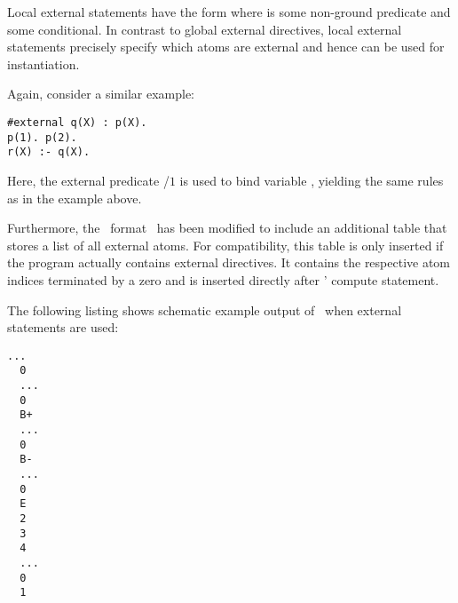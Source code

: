 Local external statements have the form  where
 is some non-ground predicate and  some conditional.
In contrast to global external directives, local external statements precisely specify 
which atoms are external and hence can be used for instantiation.
\begin{example}
Again, consider a similar example:
\begin{lstlisting}[numbers=none]
#external q(X) : p(X).
p(1). p(2).
r(X) :- q(X).
\end{lstlisting}
Here, the external predicate /$1$ is used to bind variable , 
yielding the same rules as in the example above.
\eexample
\end{example}

Furthermore, the \smodels\ format~\cite{lparseManual} has been modified to include an additional table 
that stores a list  of all external atoms. For compatibility, this table is only inserted if the 
program actually contains external directives. It contains the respective atom indices terminated
by a zero and is inserted directly after \smodels' compute statement.
\begin{example}
The following listing shows schematic example output of \gringo\ when external statements are used:
\begin{lstlisting}[numbers=none]
  ...
  0
  ...
  0
  B+
  ...
  0
  B-
  ...
  0
  E
  2
  3
  4
  ...
  0
  1
\end{lstlisting}
\eexample
\end{example}

